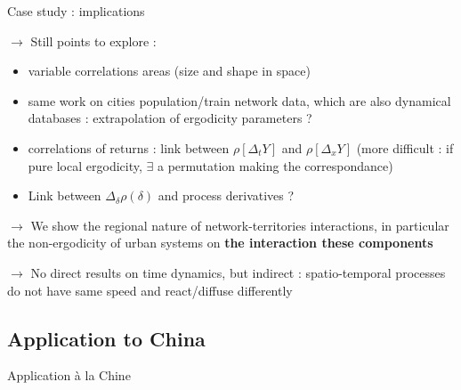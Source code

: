 %
%
%
%
%
%
%




Case study : implications

$\rightarrow$ Still points to explore :
\begin{itemize}
\item variable correlations areas (size and shape in space)
\item same work on cities population/train network data, which are also dynamical databases : extrapolation of ergodicity parameters ?
\item correlations of returns : link between $\rho\left[\Delta_t Y\right]$ and $\rho\left[\Delta_x Y\right]$ (more difficult : if pure local ergodicity, $\exists$ a permutation making the correspondance) %
\item Link between $\Delta_{\delta}\rho (\delta)$ and process derivatives ?
\end{itemize}

\bigskip

$\rightarrow$ We show the regional nature of network-territories interactions, in particular the non-ergodicity of urban systems on \textbf{the interaction these components}

\bigskip

$\rightarrow$ No direct results on time dynamics, but indirect : spatio-temporal processes do not have same speed and react/diffuse differently









\subsection{Application to China}{Application à la Chine}









